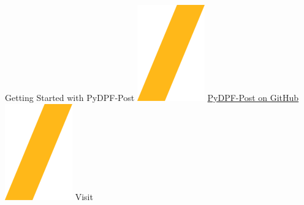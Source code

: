 \documentclass[9pt,landscape]{article}
\begin{document}
\vspace{-0.15cm}
\noindent\makebox[\linewidth]{\rule{\paperwidth}{4pt}}
\begin{center}
Getting Started with PyDPF-Post \includegraphics[height=\fontcharht\font`\S]{slash.png} \href{https://github.com/ansys/pydpf-post}{{\color{blue}PyDPF-Post on GitHub}} \includegraphics[height=\fontcharht\font`\S]{slash.png} Visit 
\end{center}
\end{document}
